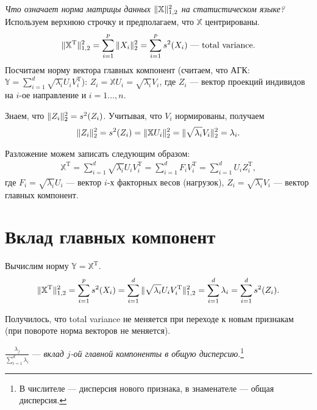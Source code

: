 \documentclass[specialist, 12pt,
subf, %
href, colorlinks=true,
substylefile = spbu.rtx,
]{disser}
\begin{document}
\textit{Что означает норма матрицы данных $\Arrowvert\mathbb{X}\Arrowvert_{1,2}^2$ на статистическом языке? } Используем верхнюю строчку и предполагаем, что $\mathbb{X}$ центрированы.
\begin{gather*}
\Arrowvert\mathbb{X}^\mathrm{T}\Arrowvert_{1,2}^2 = \sum\limits_{i = 1}^p \Arrowvert X_i\Arrowvert_2^2 = \sum\limits_{i = 1}^p s^2(X_i) \text{ --- total variance.}
\end{gather*}
Посчитаем норму вектора главных компонент (считаем, что АГК: $\mathbb{Y} = \sum\limits_{i = 1}^d \sqrt{\lambda_i} U_i V_i^{\mathrm{T}}$):
$Z_i = \mathbb{X} U_i = \sqrt{\lambda_i}V_i$, где $Z_i$ --- вектор проекций индивидов на $i$-ое направление и $i=1\ldots,n$.

Знаем, что $\Arrowvert Z_i\Arrowvert^2_2 = s^2(Z_i)$. Учитывая, что $V_i$ нормированы, получаем
\begin{gather*}
\Arrowvert Z_i\Arrowvert^2_2 = s^2(Z_i) = \Arrowvert \mathbb{X} U_i \Arrowvert ^2_2 = \Arrowvert \sqrt{\lambda_i}V_i \Arrowvert^2_2 = \lambda_i.
\end{gather*}

Разложение можем записать следующим образом:
\begin{gather*}
\mathbb{X}^\mathrm{T}=\sum\limits_{i =1}^d \sqrt{\lambda_i} U_i V_i^{\mathrm{T}} = \sum\limits_{i =1}^d F_i V_i^\mathrm{T} = \sum\limits_{i =1}^d U_i Z_i^\mathrm{T},
\end{gather*}
где $F_i=\sqrt{\lambda_i} U_i$ --- вектор $i$-х факторных весов (нагрузок), $Z_i=\sqrt{\lambda_i} V_i$ --- вектор главных компонент.

\section{Вклад главных компонент}

Вычислим норму $\mathbb{Y}=\mathbb{X}^\mathrm{T}$.
\begin{equation*}
\Arrowvert \mathbb{X}^\mathrm{T}\Arrowvert_{1,2}^2 = \sum\limits_{i = 1}^p s^2(X_i) = \sum\limits_{i =1}^d \Arrowvert \sqrt{\lambda_i}U_i V_i^\mathrm{T} \Arrowvert_{1,2}^2 = \sum\limits_{i =1}^d \lambda_i = \sum\limits_{i =1}^d s^2(Z_i).
\end{equation*}

Получилось, что total variance не меняется при переходе к новым признакам (при повороте норма векторов не меняется).

$\frac{\lambda_j}{\sum\limits_{i=1}^d \lambda_i}$ --- \textit{вклад $j$-ой главной компоненты в общую дисперсию}.\footnote{В числителе --- дисперсия нового признака, в знаменателе --- общая дисперсия.}
\end{document}
